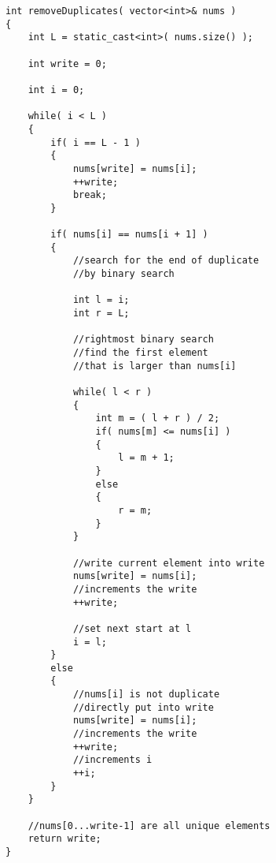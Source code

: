 \setcounter{lstlisting}{0}
\begin{lstlisting}[style=customc, caption={Binary Search With Two Pointers}]
int removeDuplicates( vector<int>& nums )
{
    int L = static_cast<int>( nums.size() );

    int write = 0;

    int i = 0;

    while( i < L )
    {
        if( i == L - 1 )
        {
            nums[write] = nums[i];
            ++write;
            break;
        }

        if( nums[i] == nums[i + 1] )
        {
            //search for the end of duplicate
            //by binary search

            int l = i;
            int r = L;

            //rightmost binary search
            //find the first element
            //that is larger than nums[i]

            while( l < r )
            {
                int m = ( l + r ) / 2;
                if( nums[m] <= nums[i] )
                {
                    l = m + 1;
                }
                else
                {
                    r = m;
                }
            }

            //write current element into write
            nums[write] = nums[i];
            //increments the write
            ++write;

            //set next start at l
            i = l;
        }
        else
        {
            //nums[i] is not duplicate
            //directly put into write
            nums[write] = nums[i];
            //increments the write
            ++write;
            //increments i
            ++i;
        }
    }

    //nums[0...write-1] are all unique elements
    return write;
}
\end{lstlisting}


